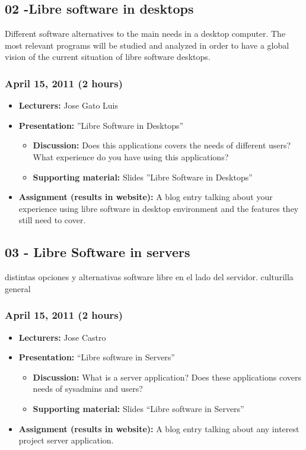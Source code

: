 \documentclass[a4paper]{article}
\begin{document}
\subsection{02 -Libre software in desktops}

Different software alternatives to the main needs in a desktop computer. The most relevant programs will be studied and analyzed in order to have a global vision of the current situation of libre software desktops. 

\subsubsection{April 15, 2011 (2 hours)}

\begin{itemize}
\item \textbf{Lecturers:} Jose Gato Luis
\item \textbf{Presentation:} ''Libre Software in Desktops''
  \begin{itemize}
  \item \textbf{Discussion:} Does this applications covers the needs of different users? What experience do you have using this applications?
  \item \textbf{Supporting material:} Slides ''Libre Software in Desktops''
  \end{itemize}
\item \textbf{Assignment (results in website):} A blog entry talking about your experience using libre software in desktop environment and the features they still need to cover. 
\end{itemize}

\subsection{03 - Libre Software in servers}

distintas opciones y alternativas software libre en el lado del servidor. culturilla general

\subsubsection{April 15, 2011 (2 hours)}

\begin{itemize}
\item \textbf{Lecturers:} Jose Castro
\item \textbf{Presentation:} ``Libre software in Servers''
  \begin{itemize}
  \item \textbf{Discussion:} What is a server application? Does these applications covers needs of sysadmins and users?
  \item \textbf{Supporting material:} Slides ``Libre software in Servers''
  \end{itemize}
\item \textbf{Assignment (results in website):} A blog entry talking about any interest project server application.
\end{itemize}
\end{document}
